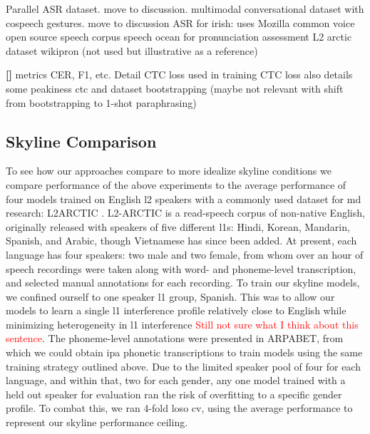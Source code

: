 \documentclass[thesis]{cluu}
\newcounter{paranum}
\newcommand{\numberedparagraph}{\par\refstepcounter{paranum}\textbf{[\theparanum] }}
\newcommand{\todo}[1]{\textcolor{red}{#1}}
\begin{document}
\textcite{conneauFLEURSFewshotLearning2022} Parallel ASR dataset. move to discussion.
\textcite{deichlerMMConvMultimodalConversational2024} multimodal conversational dataset with cospeech gestures. move to discussion
\textcite{qianAutomaticSpeechRecognition2022} ASR for irish: uses Mozilla common voice
\textcite{zhangSpeechocean762OpenSourceNonnative2021} open source speech corpus speech ocean for pronunciation assessment
\textcite{zhaoL2ARCTICNonnativeEnglish2018} L2 arctic dataset
\textcite{leeMassivelyMultilingualPronunciation} wikipron (not used but illustrative as a reference)
\numberedparagraph{metrics CER, F1, etc. Detail CTC loss used in training}
CTC loss \textcite{gravesConnectionistTemporalClassification} also details some peakiness
\textcite{kurzingerCTCSegmentationLargeCorpora2020} ctc and dataset bootstrapping (maybe not relevant with shift from bootstrapping to 1-shot paraphrasing)

\subsection{Skyline Comparison}
To see how our approaches compare to more idealize skyline conditions we compare performance of the above experiments to the average performance of four models trained on English \gls{l2} speakers with a commonly used dataset for \gls{md} research: L2ARCTIC \parencite{zhaoL2ARCTICNonnativeEnglish2018}. L2-ARCTIC is a read-speech corpus of non-native English, originally released with speakers of five different \glspl{l1}: Hindi, Korean, Mandarin, Spanish, and Arabic, though Vietnamese has since been added. At present, each language has four speakers: two male and two female, from whom over an hour of speech recordings were taken along with word- and phoneme-level transcription, and selected manual annotations for each recording. 
To train our skyline models, we confined ourself to one speaker \gls{l1} group, Spanish. This was to allow our models to learn a single \gls{l1} interference profile relatively close to English while minimizing heterogeneity in \gls{l1} interference \todo{Still not sure what I think about this sentence}. The phoneme-level annotations were presented in ARPABET, from which we could obtain \gls{ipa} phonetic transcriptions to train models using the same training strategy outlined above. Due to the limited speaker pool of four for each language, and within that, two for each gender, any one model trained with a held out speaker for evaluation ran the risk of overfitting to a specific gender profile. To combat this, we ran 4-fold \gls{loso} \gls{cv}, using the average performance to represent our skyline performance ceiling.
\end{document}

